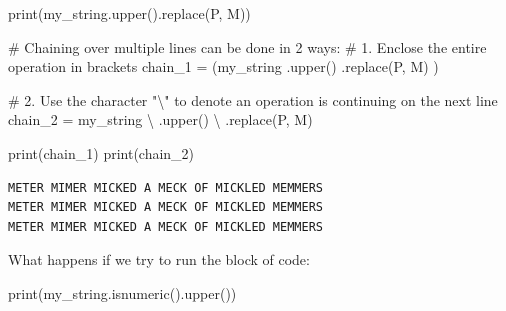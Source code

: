 \documentclass[
  letterpaper,
  DIV=11,
  numbers=noendperiod]{scrreprt}
\newenvironment{Shaded}{\begin{snugshade}}{\end{snugshade}}
\newcommand{\BuiltInTok}[1]{\textcolor[rgb]{0.00,0.23,0.31}{#1}}
\newcommand{\CommentTok}[1]{\textcolor[rgb]{0.37,0.37,0.37}{#1}}
\newcommand{\NormalTok}[1]{\textcolor[rgb]{0.00,0.23,0.31}{#1}}
\newcommand{\OperatorTok}[1]{\textcolor[rgb]{0.37,0.37,0.37}{#1}}
\newcommand{\StringTok}[1]{\textcolor[rgb]{0.13,0.47,0.30}{#1}}
\begin{document}
\begin{Shaded}
\begin{Highlighting}[]
\BuiltInTok{print}\NormalTok{(my\_string.upper().replace(}\StringTok{\textquotesingle{}P\textquotesingle{}}\NormalTok{, }\StringTok{\textquotesingle{}M\textquotesingle{}}\NormalTok{))}

\CommentTok{\# Chaining over multiple lines can be done in 2 ways:}
\CommentTok{\# 1. Enclose the entire operation in brackets}
\NormalTok{chain\_1 }\OperatorTok{=}\NormalTok{ (my\_string}
\NormalTok{    .upper()}
\NormalTok{    .replace(}\StringTok{\textquotesingle{}P\textquotesingle{}}\NormalTok{, }\StringTok{\textquotesingle{}M\textquotesingle{}}\NormalTok{)}
\NormalTok{)}

\CommentTok{\# 2. Use the character "\textbackslash{}" to denote an operation is continuing on the next line}
\NormalTok{chain\_2 }\OperatorTok{=}\NormalTok{ my\_string }\OperatorTok{\textbackslash{}}
\NormalTok{    .upper() }\OperatorTok{\textbackslash{}}
\NormalTok{    .replace(}\StringTok{\textquotesingle{}P\textquotesingle{}}\NormalTok{, }\StringTok{\textquotesingle{}M\textquotesingle{}}\NormalTok{)}

\BuiltInTok{print}\NormalTok{(chain\_1)}
\BuiltInTok{print}\NormalTok{(chain\_2)}
\end{Highlighting}
\end{Shaded}

\begin{verbatim}
METER MIMER MICKED A MECK OF MICKLED MEMMERS
METER MIMER MICKED A MECK OF MICKLED MEMMERS
METER MIMER MICKED A MECK OF MICKLED MEMMERS
\end{verbatim}

\begin{tcolorbox}[enhanced jigsaw, rightrule=.15mm, opacitybacktitle=0.6, colback=white, toprule=.15mm, colframe=quarto-callout-warning-color-frame, bottomtitle=1mm, bottomrule=.15mm, arc=.35mm, coltitle=black, breakable, title={Challenge 6}, titlerule=0mm, opacityback=0, colbacktitle=quarto-callout-warning-color!10!white, left=2mm, toptitle=1mm, leftrule=.75mm]

What happens if we try to run the block of code:

\begin{Shaded}
\begin{Highlighting}[]
\BuiltInTok{print}\NormalTok{(my\_string.isnumeric().upper())}
\end{Highlighting}
\end{Shaded}

\end{tcolorbox}
\end{document}
